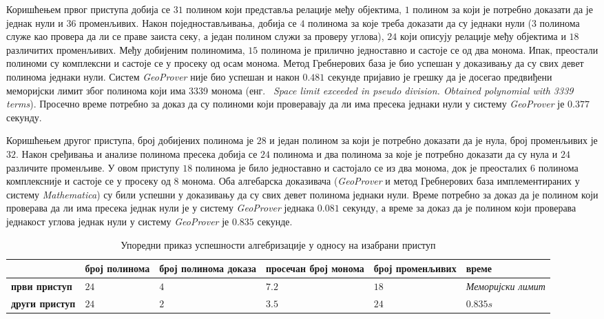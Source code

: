 Коришћењем првог приступа добија се $31$ полином који представља
релације међу објектима, $1$ полином за који је потребно доказати да
је једнак нули и $36$ променљивих. Након поједностављивања, добија се
$4$ полинома за које треба доказати да су једнаки нули ($3$ полинома
служе као провера да ли се праве заиста секу, а један полином служи за
проверу углова), $24$ који описују релације међу објектима и $18$
различитих променљивих. Међу добијеним полиномима, $15$ полинома је
прилично једноставно и састоје се од два монома. Ипак, преостали
полиноми су комплексни и састоје се у просеку од осам монома. Метод
Гребнерових база је био успешан у доказивању да су свих девет полинома
једнаки нули. Систем \emph{GeoProver} није био успешан и након $0.481$
секунде пријавио је грешку да је досегао предвиђени меморијски лимит
због полинома који има 3339 монома (енг.~ \emph{Space limit exceeded
  in pseudo division. Obtained polynomial with 3339 terms}). Просечно
време потребно за доказ да су полиноми који проверавају да ли има
пресека једнаки нули у систему \emph{GeoProver} је $0.377$ секунду.

Коришћењем другог приступа, број добијених полинома је $28$ и један
полином за који је потребно доказати да је нула, број променљивих је
$32$. Након сређивања и анализе полинома пресека добија се $24$
полинома и два полинома за које је потребно доказати да су нула и $24$
различите променљиве. У овом приступу $18$ полинома је било
једноставно и састојало се из два монома, док је преосталих $6$
полинома комплексније и састоје се у просеку од $8$ монома. Оба
алгебарска доказивача (\emph{GeoProver} и метод Гребнерових база
имплементираних у систему \emph{Mathematica}) су били успешни у
доказивању да су свих девет полинома једнаки нули. Време потребно за
доказ да је полином који проверава да ли има пресека једнак нули је у
систему \emph{GeoProver} једнака $0.081$ секунду, а време за доказ да
је полином који проверава једнакост углова једнак нули у систему
\emph{GeoProver} је $0.835$ секунде.

\begin{table}[hb]
\begin{center}
\begin{tabular}{L{2cm}||R{2cm}|R{2cm}|R{2cm}|R{2cm}|R{1.5cm}}
\                   &  број полинома & број полинома доказа & просечан број монома & број променљивих & време \\
\hline
\hline
\textbf{први приступ} & $24$ & $4$ & $7.2$ & $18$ & \emph{Меморијски лимит} \\
\hline
\textbf{други приступ} & $24$ & $2$ & $3.5$ & $24$ & $0.835s$
\end{tabular}
\caption{Упоредни приказ успешности алгебризације у односу на изабрани приступ}
\end{center}
\end{table}


